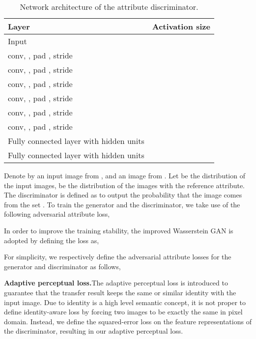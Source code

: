 \documentclass[journal]{IEEEtran}
\begin{document}
\begin{table}[htb]
\footnotesize
\caption{Network architecture of the attribute discriminator.}
\begin{center}
\begin{tabular}{l|c}
\hline
Layer&  Activation size  \\
\hline
Input&  \\
conv, , pad ,  stride  &  \\
conv, , pad ,  stride  &  \\
conv, , pad ,  stride  &  \\
conv, , pad ,  stride  &  \\
conv, , pad , stride  &  \\
conv, , pad , stride  &  \\
Fully connected layer with  hidden units&  \\
Fully connected layer with  hidden units &  \\
\hline
\end{tabular}
\end{center}
\label{table:discriminator}
\end{table}


Denote by  an input image from , and  an image from .
Let  be the distribution of the input images,  be the distribution of the images with the reference attribute.
The discriminator is defined as  to output the probability that the image  comes from the set .
To train the generator and the discriminator, we take use of the following adversarial attribute loss,

In order to improve the training stability, the improved Wasserstein GAN is adopted by defining the loss as,

For simplicity, we respectively define the adversarial attribute losses for the generator and discriminator as follows,





\textbf{Adaptive perceptual loss.}\quad  The adaptive perceptual loss is introduced to guarantee that the transfer result keeps the same or similar identity with the input image.
Due to identity is a high level semantic concept, it is not proper to define identity-aware loss by forcing two images to be exactly the same in pixel domain.
Instead, we define the squared-error loss on the feature representations of the discriminator, resulting in our adaptive perceptual loss.
\end{document}
